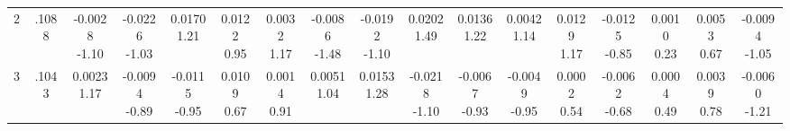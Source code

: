 \begin{landscape}
\begin{center}
{\begin{adjustbox}{max width=\textheight}
\begin{tabular}{lcccccccccccccccc}
2 & .1088 & \shortstack{-0.0028\\-1.10} & \shortstack{-0.0226\\-1.03} & \shortstack{0.0170\\1.21} & \shortstack{0.0122\\0.95} & \shortstack{0.0032\\1.17} & \shortstack{-0.0086\\-1.48} & \shortstack{-0.0192\\-1.10} & \shortstack{0.0202\\1.49} & \shortstack{0.0136\\1.22} & \shortstack{0.0042\\1.14} & \shortstack{0.0129\\1.17} & \shortstack{-0.0125\\-0.85} & \shortstack{0.0010\\0.23} & \shortstack{0.0053\\0.67} & \shortstack{-0.0094\\-1.05} \\
3 & .1043 & \shortstack{0.0023\\1.17} & \shortstack{-0.0094\\-0.89} & \shortstack{-0.0115\\-0.95} & \shortstack{0.0109\\0.67} & \shortstack{0.0014\\0.91} & \shortstack{0.0051\\1.04} & \shortstack{0.0153\\1.28} & \shortstack{-0.0218\\-1.10} & \shortstack{-0.0067\\-0.93} & \shortstack{-0.0049\\-0.95} & \shortstack{0.0002\\0.54} & \shortstack{-0.0062\\-0.68} & \shortstack{0.0004\\0.49} & \shortstack{0.0039\\0.78} & \shortstack{-0.0060\\-1.21} \\

\end{tabular}
\end{adjustbox}}
\end{center}
\end{landscape}
